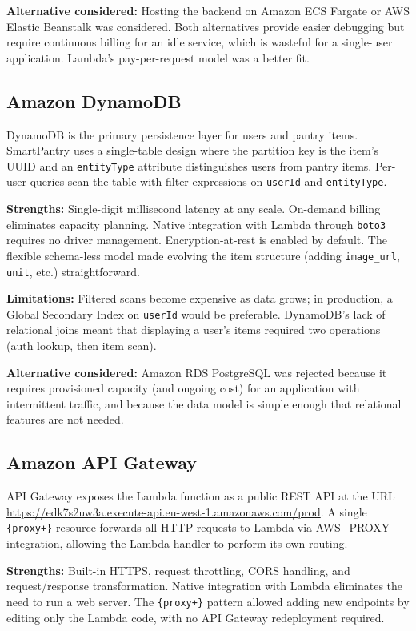 \documentclass[conference]{IEEEtran}
\begin{document}
\textbf{Alternative considered:} Hosting the backend on Amazon ECS Fargate or AWS Elastic Beanstalk was considered. Both alternatives provide easier debugging but require continuous billing for an idle service, which is wasteful for a single-user application. Lambda's pay-per-request model was a better fit.

\subsection{Amazon DynamoDB}

DynamoDB is the primary persistence layer for users and pantry items. SmartPantry uses a single-table design where the partition key is the item's UUID and an \texttt{entityType} attribute distinguishes users from pantry items. Per-user queries scan the table with filter expressions on \texttt{userId} and \texttt{entityType}.

\textbf{Strengths:} Single-digit millisecond latency at any scale. On-demand billing eliminates capacity planning. Native integration with Lambda through \texttt{boto3} requires no driver management. Encryption-at-rest is enabled by default. The flexible schema-less model made evolving the item structure (adding \texttt{image\_url}, \texttt{unit}, etc.) straightforward.

\textbf{Limitations:} Filtered scans become expensive as data grows; in production, a Global Secondary Index on \texttt{userId} would be preferable. DynamoDB's lack of relational joins meant that displaying a user's items required two operations (auth lookup, then item scan).

\textbf{Alternative considered:} Amazon RDS PostgreSQL was rejected because it requires provisioned capacity (and ongoing cost) for an application with intermittent traffic, and because the data model is simple enough that relational features are not needed.

\subsection{Amazon API Gateway}

API Gateway exposes the Lambda function as a public REST API at the URL \url{https://edk7s2uw3a.execute-api.eu-west-1.amazonaws.com/prod}. A single \texttt{\{proxy+\}} resource forwards all HTTP requests to Lambda via AWS\_PROXY integration, allowing the Lambda handler to perform its own routing.

\textbf{Strengths:} Built-in HTTPS, request throttling, CORS handling, and request/response transformation. Native integration with Lambda eliminates the need to run a web server. The \texttt{\{proxy+\}} pattern allowed adding new endpoints by editing only the Lambda code, with no API Gateway redeployment required.
\end{document}
